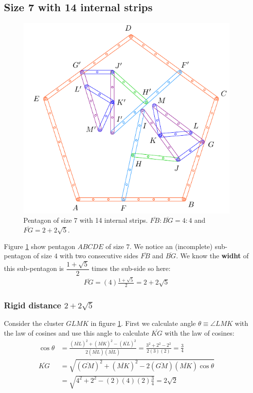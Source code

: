 \documentclass[11pt]{article}
\begin{document}
\subsection{Size 7 with 14 internal strips}

\begin{figure}[H]
\centering
\includegraphics[scale=1]{7/penta7-14a}
\caption{Pentagon of size 7 with 14 internal strips. $\overline{FB} : \overline{BG} = 4:4$ and $\overline{FG} = 2 + 2\sqrt5$.}
\label{fig:penta7-14a}
\end{figure}

Figure \ref{fig:penta7-14a} show pentagon $ABCDE$ of size $7$. We notice an (incomplete) sub-pentagon of size $4$ with two consecutive sides $\overline{FB}$ and $\overline{BG}$. We know the \textbf{widht} of this sub-pentagon is $\dfrac{1+\sqrt5}{2}$ times the sub-side so here:
\begin{align}
\overline{FG} = (4)\frac{1 + \sqrt5}2 = 2 + 2\sqrt5
\end{align}

\subsubsection{Rigid distance $2 + 2\sqrt5$}

Consider the cluster $GLMK$ in figure \ref{fig:penta7-14a}. First we calculate angle $\theta \equiv \angle{LMK}$ with the law of cosines and use this angle to calculate $\overline{KG}$ with the law of cosines:
\begin{align}
\cos\theta &= \frac{(\overline{ML})^2 + (\overline{MK})^2 - (\overline{KL})^2}
 {2(\overline{ML})(\overline{ML})}
 = \frac{3^2 + 2^2 - 2^2}{2(3)(2)} = \frac{3}4 \\
\overline{KG} &= \sqrt{(\overline{GM})^2 + (\overline{MK})^2
 - 2(\overline{GM})(\overline{MK})\cos\theta} \nonumber\\
 &= \sqrt{4^2 + 2^2 - (2)(4)(2)\frac{3}4} = 2\sqrt2
\end{align}
\end{document}
